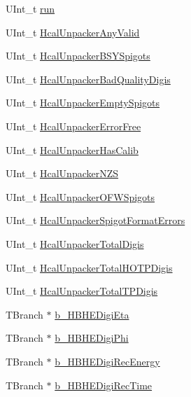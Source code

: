 \begin{DoxyCompactItemize}
U\+Int\+\_\+t \hyperlink{class_hcal_tuple_tree_a387c336e6d042e9b98d4a7552b42daf0}{run}
\item 
U\+Int\+\_\+t \hyperlink{class_hcal_tuple_tree_aa5836af17158d1bfe24fb78838c8c641}{Hcal\+Unpacker\+Any\+Valid}
\item 
U\+Int\+\_\+t \hyperlink{class_hcal_tuple_tree_a7c773a60c5bbb4114478451b065c4e07}{Hcal\+Unpacker\+B\+S\+Y\+Spigots}
\item 
U\+Int\+\_\+t \hyperlink{class_hcal_tuple_tree_a9dba097a78cfc58eec9ab8e149f20155}{Hcal\+Unpacker\+Bad\+Quality\+Digis}
\item 
U\+Int\+\_\+t \hyperlink{class_hcal_tuple_tree_a32c6d9d87a0fc537de1d48c8cb37423a}{Hcal\+Unpacker\+Empty\+Spigots}
\item 
U\+Int\+\_\+t \hyperlink{class_hcal_tuple_tree_ac97729e4a501486a76c030ad3477fd0d}{Hcal\+Unpacker\+Error\+Free}
\item 
U\+Int\+\_\+t \hyperlink{class_hcal_tuple_tree_a4d23f168f9e4948b045b705731d1d45d}{Hcal\+Unpacker\+Has\+Calib}
\item 
U\+Int\+\_\+t \hyperlink{class_hcal_tuple_tree_adf6324d2cb40e19a2e5f21f50782b57a}{Hcal\+Unpacker\+N\+Z\+S}
\item 
U\+Int\+\_\+t \hyperlink{class_hcal_tuple_tree_ac79c12cb05d569a9ff352cd14d43a9a4}{Hcal\+Unpacker\+O\+F\+W\+Spigots}
\item 
U\+Int\+\_\+t \hyperlink{class_hcal_tuple_tree_ab4502a1a4a6f7991d0f31037629d97e5}{Hcal\+Unpacker\+Spigot\+Format\+Errors}
\item 
U\+Int\+\_\+t \hyperlink{class_hcal_tuple_tree_a242efa87206609b258889647bd7e43a3}{Hcal\+Unpacker\+Total\+Digis}
\item 
U\+Int\+\_\+t \hyperlink{class_hcal_tuple_tree_a1e0af5cb1807324313c88596f45e2714}{Hcal\+Unpacker\+Total\+H\+O\+T\+P\+Digis}
\item 
U\+Int\+\_\+t \hyperlink{class_hcal_tuple_tree_a5482217d22a5c536052aad17145cac3d}{Hcal\+Unpacker\+Total\+T\+P\+Digis}
\item 
T\+Branch $\ast$ \hyperlink{class_hcal_tuple_tree_a2b1691084e9caadecc33e8f11dd954e6}{b\+\_\+\+H\+B\+H\+E\+Digi\+Eta}
\item 
T\+Branch $\ast$ \hyperlink{class_hcal_tuple_tree_a2cd86d0c6fe62416a3db3118feb29aa6}{b\+\_\+\+H\+B\+H\+E\+Digi\+Phi}
\item 
T\+Branch $\ast$ \hyperlink{class_hcal_tuple_tree_a6d9dadbb9ea5ffd0bd426c3a210f7c73}{b\+\_\+\+H\+B\+H\+E\+Digi\+Rec\+Energy}
\item 
T\+Branch $\ast$ \hyperlink{class_hcal_tuple_tree_ad081f8b42cf7a8f06aadb8bbec1215b0}{b\+\_\+\+H\+B\+H\+E\+Digi\+Rec\+Time}

\end{DoxyCompactItemize}
